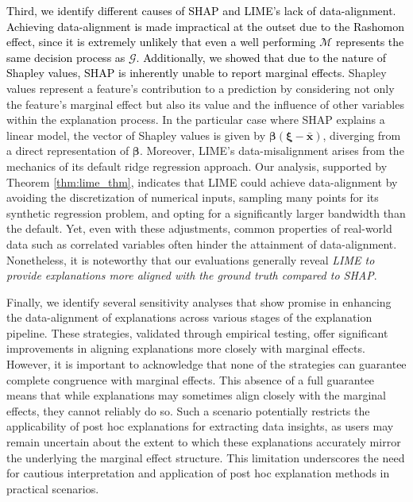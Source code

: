 \documentclass[mnsc,blindrev]{informs3}
\begin{document}
        \textcolor{black}{Third, we identify different causes of SHAP and LIME's lack of data-alignment. Achieving data-alignment is made impractical at the outset due to the Rashomon effect, since it is extremely unlikely that even a well performing $\mathcal{M}$ represents the same decision process as $\mathcal{G}$. Additionally, we showed that due to the nature of Shapley values, SHAP is inherently unable to report marginal effects.} Shapley values represent a feature's contribution to a prediction by considering not only the feature's marginal effect but also its value and the influence of other variables within the explanation process. In the particular case where SHAP explains a linear model, the vector of Shapley values is given by $\boldsymbol{\beta}(\boldsymbol{\xi}-\bar{\mathbf{x}})$, diverging from a direct representation of $\boldsymbol{\beta}$. Moreover, LIME's data-misalignment arises from the mechanics of its default ridge regression approach. Our analysis, supported by Theorem \ref{thm:lime_thm}, indicates that LIME could achieve data-alignment by avoiding the discretization of numerical inputs, sampling many points for its synthetic regression problem, and opting for a significantly larger bandwidth than the default. Yet, even with these adjustments, common properties of real-world data such as correlated variables often hinder the attainment of data-alignment. Nonetheless, it is noteworthy that our evaluations generally reveal \textit{LIME to provide explanations more aligned with the ground truth compared to SHAP}.
 
        
         Finally, we identify several sensitivity analyses that show promise in enhancing the data-alignment of explanations across various stages of the explanation pipeline. These strategies, validated through empirical testing, offer significant improvements in aligning explanations more closely with marginal effects. However, it is important to acknowledge that none of the strategies can guarantee complete congruence with marginal effects. This absence of a full guarantee means that while explanations may sometimes align closely with the marginal effects, they cannot reliably do so. Such a scenario potentially restricts the applicability of post hoc explanations for extracting data insights, as users may remain uncertain about the extent to which these explanations accurately mirror the underlying the marginal effect structure. This limitation underscores the need for cautious interpretation and application of post hoc explanation methods in practical scenarios.
        
\end{document}
